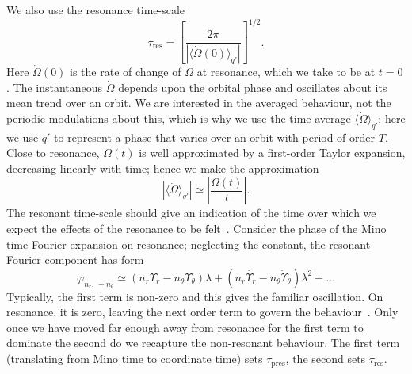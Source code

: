 \documentclass[aps,prd,amsfonts,amssymb,amsmath,nofootinbib,reprint,showpacs,superscriptaddress,twocolumn]{revtex4}
\newcommand{\sub}[1]{\ensuremath{_\text{#1}}}
\begin{document}
We also use the resonance time-scale
\begin{equation}
\tau\sub{res} = \left[\frac{2\pi}{\left|\langle\dot{\Omega}(0)\rangle_{q'}\right|}\right]^{1/2}.
\label{eq:t-res}
\end{equation}
Here $\dot{\Omega}(0)$ is the rate of change of $\Omega$ at resonance, which we take to be at $t = 0$. The instantaneous $\dot{\Omega}$ depends upon the orbital phase and oscillates about its mean trend over an orbit. We are interested in the averaged behaviour, not the periodic modulations about this, which is why we use the time-average $\langle\dot{\Omega}\rangle_{q'}$; here we use $q'$ to represent a phase that varies over an orbit with period of order $T$. Close to resonance, $\Omega(t)$ is well approximated by a first-order Taylor expansion, decreasing linearly with time; hence we make the approximation
\begin{equation}
\left|\langle\dot{\Omega}\rangle_{q'}\right| \simeq \left|\frac{\Omega(t)}{t}\right|.
\end{equation}
The resonant time-scale should give an indication of the time over which we expect the effects of the resonance to be felt~\cite{Bosley1992}. Consider the phase of the Mino time Fourier expansion on resonance; neglecting the constant, the resonant Fourier component has form
\begin{equation}
\varphi_{n_r,\,-n_\theta} \simeq \left(n_r\Upsilon_r - n_\theta\Upsilon_\theta\right)\lambda + \left(n_r\dot{\Upsilon_r} - n_\theta\dot{\Upsilon}_\theta\right)\lambda^2 + \ldots
\end{equation}
Typically, the first term is non-zero and this gives the familiar oscillation. On resonance, it is zero, leaving the next order term to govern the behaviour~\cite{Flanagan2012}. Only once we have moved far enough away from resonance for the first term to dominate the second do we recapture the non-resonant behaviour. The first term (translating from Mino time to coordinate time) sets $\tau\sub{pres}$, the second sets $\tau\sub{res}$.
\end{document}
